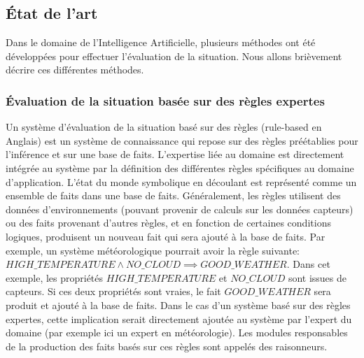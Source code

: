 \documentclass[a4paper,11pt,twoside]{StyleThese}
\begin{document}


\subsection{État de l'art}

Dans le domaine de l'Intelligence Artificielle, plusieurs méthodes ont été développées pour effectuer l'évaluation de la situation. Nous allons brièvement décrire ces différentes méthodes.

\subsubsection{Évaluation de la situation basée sur des règles expertes}
Un système d'évaluation de la situation basé sur des règles (rule-based en Anglais) est un système de connaissance qui repose sur des règles préétablies pour l'inférence et sur une base de faits. L'expertise liée au domaine est directement intégrée au système par la définition des différentes règles spécifiques au domaine d'application. L'état du monde symbolique en découlant est représenté comme un ensemble de faits dans une base de faits.
Généralement, les règles utilisent des données d'environnements (pouvant provenir de calculs sur les données capteurs) ou des faits provenant d'autres règles, et en fonction de certaines conditions logiques, produisent un nouveau fait qui sera ajouté à la base de faits. 
Par exemple, un système météorologique pourrait avoir la règle suivante: \newline
$HIGH\_TEMPERATURE \land NO\_CLOUD \implies GOOD\_WEATHER$. \newline
Dans cet exemple, les propriétés $HIGH\_TEMPERATURE$ et $NO\_CLOUD$ sont issues de capteurs. Si ces deux propriétés sont vraies, le fait $GOOD\_WEATHER$ sera produit et ajouté à la base de faits. Dans le cas d'un système basé sur des règles expertes, cette implication serait directement ajoutée au système par l'expert du domaine (par exemple ici un expert en météorologie). 
Les modules responsables de la production des faits basés sur ces règles sont appelés des raisonneurs.
\end{document}
